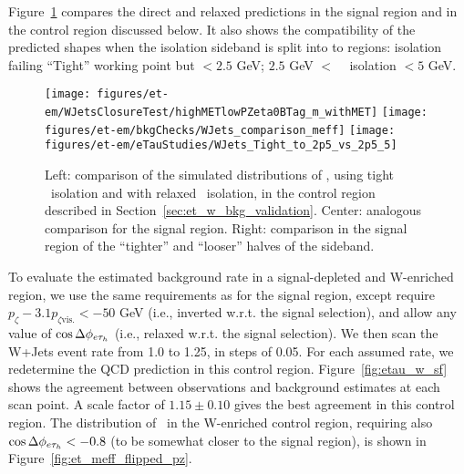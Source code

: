 Figure~\ref{fig:et-w-shape} compares the direct and relaxed
predictions in the signal region and in the control region discussed
below.  It also shows the compatibility of the predicted shapes when
the isolation sideband is split into to regions: \tauh isolation
failing ``Tight'' working point but $<2.5$ GeV; $2.5$ GeV $<$ \tauh ~
isolation $< 5$ GeV.

\begin{figure}[thbp!]\centering
  \texttt{[image: figures/et-em/WJetsClosureTest/highMETlowPZeta0BTag\_m\_withMET]}
  \texttt{[image: figures/et-em/bkgChecks/WJets\_comparison\_meff]}
  \texttt{[image: figures/et-em/eTauStudies/WJets\_Tight\_to\_2p5\_vs\_2p5\_5]}
  \caption{\label{fig:et-w-shape} Left: comparison of the simulated
    distributions of \meffetau , using tight \tauh ~isolation and with
    relaxed \tauh ~isolation, in the control region described in
    Section~\ref{sec:et_w_bkg_validation}.  Center: analogous
    comparison for the signal region.  Right: comparison in the signal
    region of the ``tighter'' and ``looser'' halves of the sideband.}
\end{figure}

To evaluate the estimated background rate in a signal-depleted and
W-enriched region, we use the same requirements as for the signal
region, except require $p_{\zeta} - 3.1 p_{\zeta\mathrm{vis.}}<
-50$ GeV (i.e., inverted w.r.t. the signal selection), and allow
any value of $\cos{\Delta\phi_{e\ensuremath{\tau_h}}}$ (i.e., relaxed w.r.t. the
signal selection).  We then scan the W+Jets event rate from 1.0 to
1.25, in steps of 0.05.  For each assumed rate, we redetermine the QCD
prediction in this control region.  Figure~\ref{fig:etau_w_sf} shows
the agreement between observations and background estimates at each
scan point.  A scale factor of $1.15\pm0.10$ gives the best agreement
in this control region.  The distribution of \meffetau ~in the
W-enriched control region, requiring also
$\cos{\Delta\phi_{e\ensuremath{\tau_h}}}<-0.8$ (to be somewhat closer to the signal
region), is shown in Figure~\ref{fig:et_meff_flipped_pz}.

